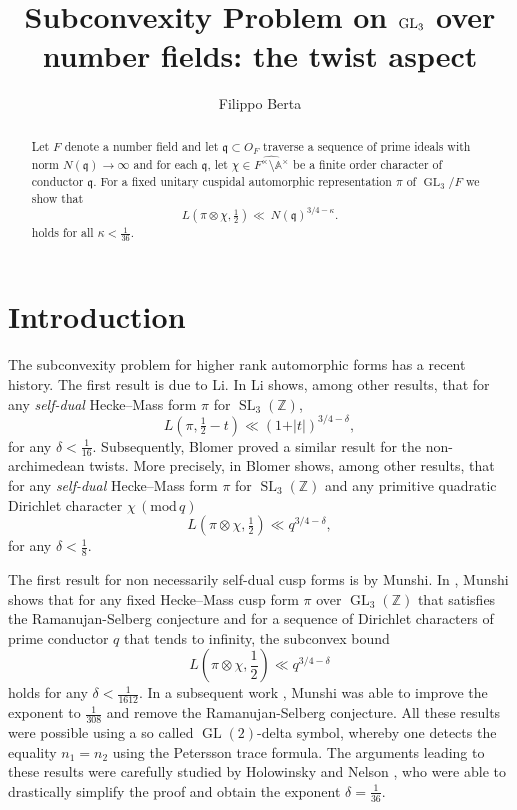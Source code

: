 \documentclass[a4paper,11pt]{amsart}
\title{Subconvexity Problem on $\gelle_3$ over number fields: the twist aspect}
\author{Filippo Berta}
\date{}
\theoremstyle{definition}
\newcommand{\A}{\mathbb{A}}
\newcommand{\Z}{\mathbb{Z}}
\newcommand{\gelle}{\operatorname{GL}}
\newcommand{\mods}[1]{\,(\mathrm{mod}\,{#1})}
\begin{document}
\begin{abstract} Let $F$ denote a number field and let $\mathfrak{q}\subset O_F$ traverse a sequence of prime ideals with norm $N(\mathfrak{q}) \to \infty$ and for each $\mathfrak{q}$, let $\chi \in \widehat{F^{\times}\setminus \A^\times}$ be a finite order character of conductor $\mathfrak{q}$. For a fixed unitary cuspidal automorphic representation $\pi$ of $\gelle_3/F$ we show that 
\begin{equation*}
L(\pi \otimes \chi,\tfrac{1}{2})\ll \ N(\mathfrak{q})^{3/4-\kappa}.\end{equation*} holds for all $\kappa< \frac{1}{36}$.
\end{abstract}
\maketitle

\section{Introduction } 

The subconvexity problem for higher rank automorphic forms has a recent history. 
The first result is due to Li. In \cite[Corollary 1.2]{Li2011GL3GL2} Li shows, among other results, that for any \emph{self-dual} Hecke--Mass form $\pi$ for $\operatorname{SL}_3(\Z)$,
\[L(\pi,\tfrac{1}{2}-t) \ll (1+\vert t\vert)^{3/4-\delta}, \]
for any $\delta < \frac{1}{16}$.
Subsequently, Blomer proved a similar result for the non-archimedean twists. More precisely, in \cite{blomersubconvexity} Blomer shows, among other results, that for any \emph{self-dual} Hecke--Mass form $\pi$ for $\operatorname{SL}_3(\Z)$ and any primitive quadratic Dirichlet character $\chi \mods{q}$
\[L(\pi\otimes \chi,\tfrac{1}{2}) \ll q^{3/4-\delta}, \]
for any $\delta < \frac{1}{8}$.

The first result for non necessarily self-dual cusp forms is by Munshi. In \cite{munshioriginal}, Munshi shows that for any fixed Hecke--Mass cusp form $\pi$ over $\gelle_3(\Z)$ that satisfies the Ramanujan-Selberg conjecture and for a sequence of Dirichlet characters of prime conductor $q$ that tends to infinity, the subconvex bound
\[L\left(\pi \otimes \chi, \frac{1}{2}\right)\ll q^{3/4-\delta} \]
holds for any $\delta < \frac{1}{1612}$. In a subsequent work \cite{Munshi1}, Munshi  was able to improve the exponent to $\frac{1}{308}$ and remove the Ramanujan-Selberg conjecture. All these results were possible using a so called $\gelle(2)$-delta symbol, whereby one detects the equality $n_1=n_2$ using the Petersson trace formula. The arguments leading to these results were carefully studied by Holowinsky and Nelson \cite{nelsonholowinsky}, who were able to drastically simplify the proof and obtain the exponent $\delta = \frac{1}{36}$.
\end{document}
